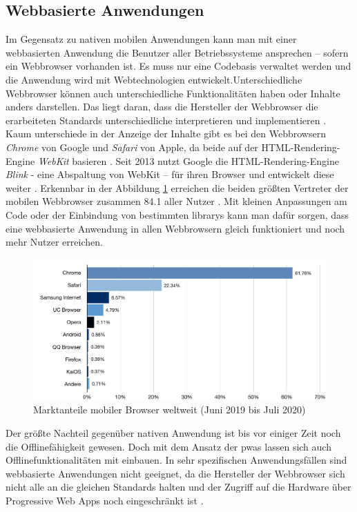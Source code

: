 \subsection{Webbasierte Anwendungen}
Im Gegensatz zu nativen mobilen Anwendungen kann man mit einer webbasierten Anwendung die Benutzer aller Betriebssysteme ansprechen – sofern ein Webbrowser vorhanden ist. Es muss nur eine Codebasis verwaltet werden und die Anwendung wird mit Webtechnologien entwickelt.Unterschiedliche Webbrowser können auch unterschiedliche Funktionalitäten haben oder Inhalte anders darstellen. Das liegt daran, dass die Hersteller der Webbrowser die erarbeiteten Standards unterschiedliche interpretieren und implementieren \parencite{RED2016}.
Kaum unterschiede in der Anzeige der Inhalte gibt es bei den Webbrowsern \textit{Chrome} von Google und \textit{Safari} von Apple, da beide auf der HTML-Rendering-Engine \textit{WebKit} basieren \parencite{PIC2008}. Seit 2013 nutzt Google die HTML-Rendering-Engine \textit{Blink} - eine Abspaltung von WebKit – für ihren Browser und entwickelt diese weiter \parencite{BAR2013}. Erkennbar in der Abbildung \ref{fig:browser-market-share} erreichen die beiden größten Vertreter der mobilen Webbrowser zusammen \SI{84.1}{\prc} aller Nutzer \parencite{STA2020}.
Mit kleinen Anpassungen am Code oder der Einbindung von bestimmten \Glspl{library} kann man dafür sorgen, dass eine webbasierte Anwendung in allen Webbrowsern gleich funktioniert und noch mehr Nutzer erreichen.
\begin{figure}[h!]
	\includegraphics[scale=0.65]{images/browser-market-share}
	\caption{Marktanteile mobiler Browser weltweit (Juni 2019 bis Juli 2020)}
	\label{fig:browser-market-share}
\end{figure}
Der größte Nachteil gegenüber nativen Anwendung ist bis vor einiger Zeit noch die Offlinefähigkeit gewesen. Doch mit dem Ansatz der \Glspl{pwa} lassen sich auch Offlinefunktionalitäten mit einbauen. In sehr spezifischen Anwendungsfällen sind webbasierte Anwendungen nicht geeignet, da die Hersteller der Webbrowser sich nicht alle an die gleichen Standards halten und der Zugriff auf die Hardware über Progressive Web Apps noch eingeschränkt ist \parencite{TOR2020}.

